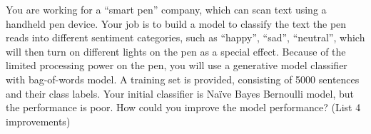 You are working for a “smart pen” company, which can scan text using a handheld pen device. Your job is to build a model to classify the text the pen reads into different sentiment categories, such as “happy”, “sad”, “neutral”, which will then turn on different lights on the pen as a special effect. Because of the limited processing power on the pen, you will use a generative model classifier with bag-of-words model. A training set is provided, consisting of 5000 sentences and their class labels. Your initial classifier is Naïve Bayes Bernoulli model, but the performance is poor. How could you improve the model performance? (List 4 improvements)
